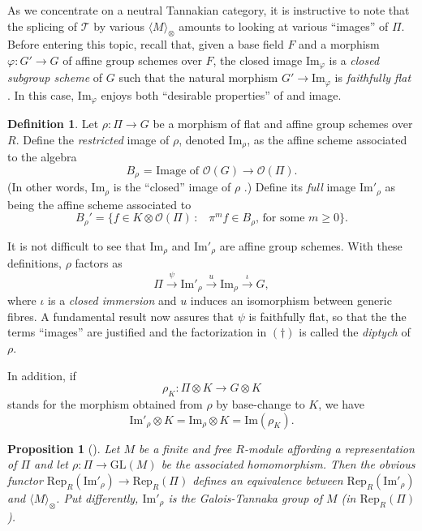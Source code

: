 \documentclass[10pt]{alggeom}
\renewcommand{\ge}{\geqslant}
\newtheorem{propo}[thm]{Proposition}
\theoremstyle{definition}
\newtheorem{dfn}[thm]{Definition}
\numberwithin{equation}{section}
\begin{document}
As we concentrate on a neutral Tannakian category, it is instructive to note that the splicing of $\mathcal T$ by various $\langle M\rangle_\otimes$ amounts to looking at various ``images'' of $\Pi$.  Before entering this topic, recall that, given a base field  $F$ and   a morphism $\varphi:G'\to G$ of affine group schemes over $F$,  the closed image $\mathrm{Im}_\varphi$   \cite[I.9.5]{EGA} is a {\it closed subgroup  scheme} of $G$  such that the natural morphism  $G'\to \mathrm{Im}_\varphi$ is {\it faithfully flat} \cite[Theorem on 15.1]{waterhouse79}. In this case, $\mathrm{Im}_\varphi$ enjoys both ``desirable properties'' of 
and image. 

\begin{dfn}Let   $\rho:\Pi\to G$ be a morphism of flat and affine group schemes over $R$. Define the {\it restricted} image of $\rho$, denoted $\mathrm{Im}_\rho$, as the affine scheme associated to the algebra  
\[
\text{$B_\rho$ = Image of $\mathcal O(G)\to \mathcal O(\Pi)$.}
\] (In other words, $\mathrm{Im}_\rho$ is the ``closed'' image of $\rho$ \cite[I.9.5]{EGA}.)
Define its {\it full} image $\mathrm{Im}'_\rho$ as being the affine scheme associated to   
\[\tag{\S}
B_\rho'=\{f\in K\otimes \mathcal O(\Pi)\,:\,\text{   $\pi^mf\in B_\rho$, for some $m\ge0$}\}.
\]
\end{dfn}
It is not difficult to see that $\mathrm{Im}_\rho$ and $\mathrm{Im}'_\rho$ are affine group schemes. 
With these definitions,         $\rho$ factors as
\[\tag{$\dagger$}
\Pi \stackrel \psi\longrightarrow  \mathrm{Im}'_\rho \stackrel u \longrightarrow   \mathrm{Im}_\rho \stackrel \iota\longrightarrow    G,
\]
where   $\iota$ is a {\it closed immersion} and $u$ induces an isomorphism between generic fibres. A fundamental result \cite[Theorem 4.1.1]{duong-hai18} now assures that $\psi$ is faithfully flat, so that the the terms ``images''  are justified and the factorization in $(\dagger)$  is called the {\it diptych} of $\rho$. 


 In addition, if \[\rho_K:\Pi\otimes K\longrightarrow G\otimes K\] stands for the morphism obtained from $\rho$ by base-change to $K$, we have 
\[
\mathrm{Im}'_\rho\otimes K=\mathrm{Im}_\rho\otimes K=\mathrm{Im}(\rho_K).
\]


\begin{propo}[{\cite[Proposition 4.10]{duong-hai-dos_santos18}}]\label{05.06.2023--1jp}
Let $M$ be a finite and free $R$-module affording a representation of $\Pi$ and let $\rho:\Pi\to \mathrm{GL}(M)$ be the associated  homomorphism. Then  the obvious functor $\mathrm{Rep}_R(\mathrm{Im}'_\rho)\to\mathrm{Rep}_R(\Pi)$ defines an equivalence between $\mathrm{Rep}_R(\mathrm{Im}'_\rho)$ and $\langle M\rangle_\otimes$. Put differently, $\mathrm{Im}'_\rho$ is the Galois-Tannaka group of $M$ (in $\mathrm{Rep}_R(\Pi)$). 
\end{propo}
\end{document}
